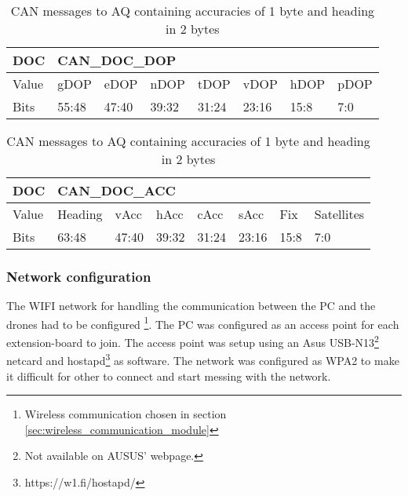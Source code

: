 \begin{table}[H]
	\begin{tabular}{@{}|l|l|l|l|l|l|l|l|@{}}
		\toprule
		DOC   & \multicolumn{7}{l|}{CAN\_DOC\_DOP}                  \\ \midrule
		Value & gDOP  & eDOP  & nDOP  & tDOP  & vDOP  & hDOP & pDOP \\ \midrule
		Bits  & 55:48 & 47:40 & 39:32 & 31:24 & 23:16 & 15:8 & 7:0  \\ \bottomrule
	\end{tabular}
	\caption{CAN messages to \ac{AQ} containing \ac{DOP}s each of 1 byte}
	\label{tab:CAN_DOC_DOP}
	\begin{tabular}{@{}|l|l|l|l|l|l|l|l|@{}}
		\toprule
		DOC   & \multicolumn{7}{l|}{CAN\_DOC\_ACC}                          \\ \midrule
		Value & Heading & vAcc  & hAcc  & cAcc  & sAcc  & Fix  & Satellites \\ \midrule
		Bits  & 63:48   & 47:40 & 39:32 & 31:24 & 23:16 & 15:8 & 7:0        \\ \bottomrule
	\end{tabular}\label{tab:CAN_DOC_ACC}
	\caption{CAN messages to \ac{AQ} containing accuracies of 1 byte and heading in 2 bytes} 
\end{table}

\subsubsection*{Network configuration}  \label{sec:network_configuration}
The WIFI  network for handling the communication between the PC and the drones had to be configured \footnote{Wireless communication chosen in  section \ref{sec:wireless_communication_module}}.
The PC was configured as an access point for each extension-board to join. The access point was setup using an Asus USB-N13\footnote{Not available on AUSUS' webpage.} netcard and hostapd\footnote{https://w1.fi/hostapd/} as software. The network was configured as \ac{WPA2} to make it difficult for other to connect and start messing with the network.

